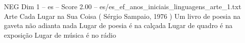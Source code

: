 \begin{textsample}{NEG Dim 1 – es – Score 2.00 – es/es\_ef\_anos\_iniciais\_linguagens\_arte\_1.txt}  \label{ex:f1_neg_094}
Arte Cada Lugar na Sua Coisa ( Sérgio Sampaio, 1976 ) Um livro de poesia na gaveta não adianta nada Lugar de poesia é na calçada Lugar de quadro é na exposição Lugar de música é no rádio

\end{textsample}
